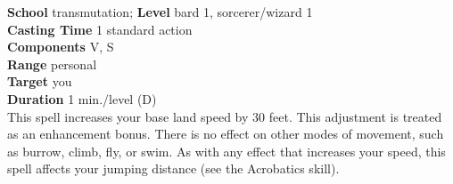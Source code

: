 \textbf{School} transmutation; \textbf{Level} bard 1, sorcerer/wizard 1\\
\textbf{Casting Time} 1 standard action\\
\textbf{Components} V, S\\
\textbf{Range} personal\\
\textbf{Target} you\\
\textbf{Duration} 1 min./level (D)\\
This spell increases your base land speed by 30 feet. This adjustment is treated as an enhancement bonus. There is no effect on other modes of movement, such as burrow, climb, fly, or swim. As with any effect that increases your speed, this spell affects your jumping distance (see the Acrobatics skill).\\
